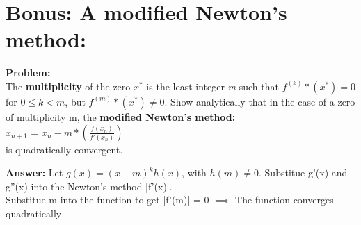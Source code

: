 \section{Bonus: A modified Newton's method:}%
\label{sec:bonus_a_modified_newton_s_method_}

\textbf{Problem:}\\
The \textbf{multiplicity} of the zero $x^*$ is the least integer \textit{m} such that  $f^(k)*(x^*) = 0$ for  $0 \le k < m$, but $f^(m)*(x^*) \neq 0.$
Show analytically that in the case of a zero of multiplicity m, the \textbf{modified Newton's method:}
\\
$x_{n+1}$ = $x_{n} - m* (\frac{f(x_{n})}{f'(x_{n})})$\\
 is quadratically convergent.

 \textbf{Answer:}
 Let $g(x) = (x-m)^{k}h(x)$, with $h(m) \neq 0$.
 Substitue g'(x) and g''(x) into the Newton's method |f'(x)|.\\
 Substitue m into the function to get |f'(m)| = 0 $\implies$ The function converges quadratically
